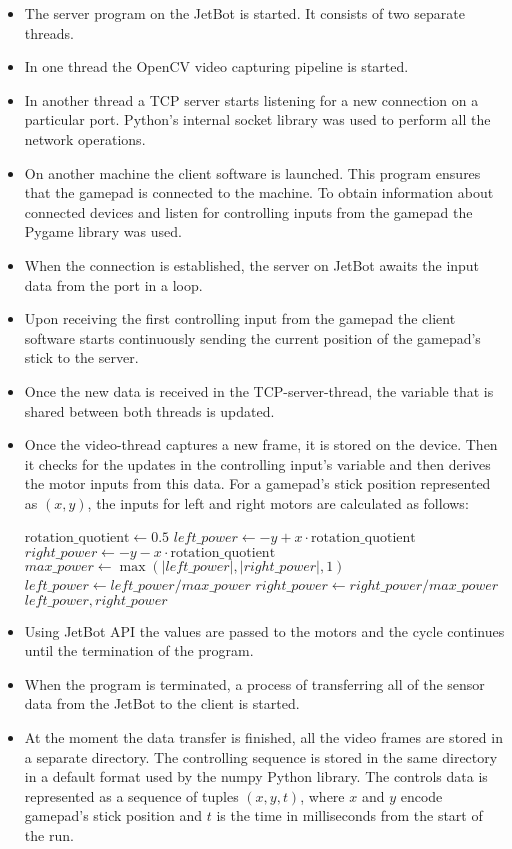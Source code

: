 \begin{itemize}
  \item The server program on the JetBot is started. It consists of two separate threads.
  \item In one thread the OpenCV video capturing pipeline is started.
  \item In another thread a TCP server starts listening for a new connection on a particular port. Python's internal socket library was used to perform all the network operations.
  \item On another machine the client software is launched. This program ensures that the gamepad is connected to the machine. To obtain information about connected devices and listen for controlling inputs from the gamepad the Pygame library was used.
  \item When the connection is established, the server on JetBot awaits the input data from the port in a loop.
  \item Upon receiving the first controlling input from the gamepad the client software starts continuously sending the current position of the gamepad's stick to the server.
  \item Once the new data is received in the TCP-server-thread, the variable that is shared between both threads is updated.
  \item Once the video-thread captures a new frame, it is stored on the device. Then it checks for the updates in the controlling input's variable and then derives the motor inputs from this data. For a gamepad's stick position represented as $(x, y)$, the inputs for left and right motors are calculated as follows:
    \begin{algorithmic}[1]
      \State $\text{rotation\_quotient} \gets 0.5$
      \State $left\_power \gets -y + x \cdot \text{rotation\_quotient}$
      \State $right\_power \gets -y - x \cdot \text{rotation\_quotient}$
      \State $max\_power \gets \max\left( \left|left\_power\right|, \left|right\_power\right|, 1 \right)$
      \State $left\_power \gets left\_power / max\_power$
      \State $right\_power \gets right\_power / max\_power$
      \State \Return $left\_power, right\_power$
      \EndFunction
    \end{algorithmic}
  \item Using JetBot API the values are passed to the motors and the cycle continues until the termination of the program.
  \item When the program is terminated, a process of transferring all of the sensor data from the JetBot to the client is started.
  \item At the moment the data transfer is finished, all the video frames are stored in a separate directory. The controlling sequence is stored in the same directory in a default format used by the numpy Python library. The controls data is represented as a sequence of tuples $(x, y, t)$, where $x$ and $y$ encode gamepad's stick position and $t$ is the time in milliseconds from the start of the run.
\end{itemize}

